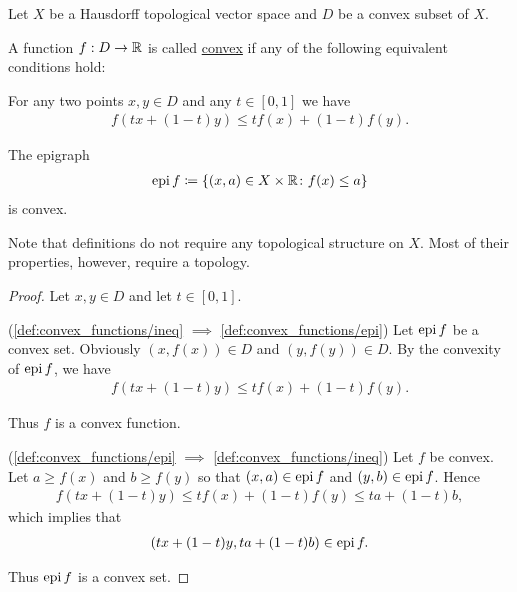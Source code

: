 Let $X$ be a Hausdorff topological vector space and $D$ be a convex subset of $X$.

\begin{definition}\label{def:convex_functions}
  A function $f: D \to \mathbb R$ is called \uline{convex} if any of the following equivalent conditions hold:

  \begin{defenum}
    \item\label{def:convex_functions/ineq} For any two points $x, y \in D$ and any $t \in [0, 1]$ we have
    \begin{align*}
      f(tx + (1-t)y) \leq tf(x) + (1-t)f(y).
    \end{align*}

    \item\label{def:convex_functions/epi} The epigraph
    \begin{align*}
      \operatorname{epi} f \coloneqq \{ (x, a) \in X \times \mathbb R \colon f(x) \leq a \}
    \end{align*}
    is convex.
  \end{defenum}

  Note that definitions do not require any topological structure on $X$. Most of their properties, however, require a topology.
\end{definition}
\begin{proof}
  Let $x, y \in D$ and let $t \in [0, 1]$.

  (\ref{def:convex_functions/ineq} $\implies$ \ref{def:convex_functions/epi}) Let $\operatorname{epi} f$ be a convex set. Obviously $(x, f(x)) \in D$ and $(y, f(y)) \in D$. By the convexity of $\operatorname{epi} f$, we have
  \begin{align*}
    f(tx + (1-t)y) \leq tf(x) + (1-t)f(y).
  \end{align*}

  Thus $f$ is a convex function.

  (\ref{def:convex_functions/epi} $\implies$ \ref{def:convex_functions/ineq}) Let $f$ be convex. Let $a \geq f(x)$ and $b \geq f(y)$ so that $(x, a) \in \operatorname{epi} f$ and $(y, b) \in \operatorname{epi} f$. Hence
  \begin{align*}
    f(tx + (1-t)y) \leq tf(x) + (1-t)f(y) \leq ta + (1-t)b,
  \end{align*}
  which implies that
  \begin{align*}
    (tx + (1-t)y, ta + (1-t)b) \in \operatorname{epi} f.
  \end{align*}

  Thus $\operatorname{epi} f$ is a convex set.
\end{proof}

